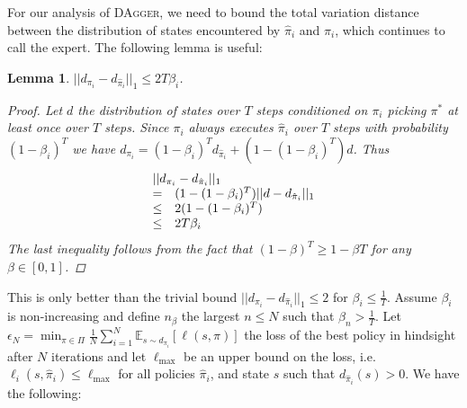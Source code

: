 \documentclass[twoside]{article}
\newtheorem{lem}{Lemma}[section]
\newcommand{\todo}[1]{\textcolor{red}{[To do: #1]}\index[todo]{#1}}
\begin{document}

For our analysis of \textsc{DAgger}, we need to bound the total variation distance between the distribution of states encountered by $\hat{\pi}_i$ and $\pi_i$,
which continues to call the expert. The following lemma is useful:
%
\begin{lem}
$||d_{\pi_i} - d_{\hat{\pi}_i}||_1 \leq 2 T \beta_i$.
\begin{proof}
Let $d$ the distribution of states over $T$ steps conditioned on $\pi_i$ picking $\pi^*$ at least once over $T$ steps. Since $\pi_i$ always executes $\hat{\pi}_i$ over $T$ steps with probability $(1-\beta_i)^T$ we have $d_{\pi_i} = (1-\beta_i)^T d_{\hat{\pi}_i} + (1-(1-\beta_i)^T) d$. Thus
\begin{displaymath}
\begin{array}{rl}
\multicolumn{2}{l}{||d_{\pi_i} - d_{\hat{\pi}_i}||_1}\\
= & (1-(1-\beta_i)^T) ||d - d_{\hat{\pi}_i}||_1\\
\leq & 2 (1-(1-\beta_i)^T)\\
\leq & 2 T \beta_i \\
\end{array}
\end{displaymath}
The last inequality follows from the fact that $(1-\beta)^T \geq 1 - \beta T$ for any $\beta \in [0,1]$.
\end{proof}
\end{lem}
This is only better than the trivial bound $||d_{\pi_i} - d_{\hat{\pi}_i}||_1 \leq 2$ for $\beta_i \leq \frac{1}{T}$. Assume $\beta_i$ is non-increasing and define $n_\beta$ the largest $n \leq N$ such that $\beta_n > \frac{1}{T}$. Let $\epsilon_N = \min_{\pi \in \Pi} \frac{1}{N} \sum_{i=1}^N \mathbb{E}_{s \sim d_{\pi_i}}[ \ell(s,\pi) ]$ the loss of the best policy in hindsight after $N$ iterations and let $\ell_{\max}$ be an upper bound on the loss, i.e. $\ell_i(s,\hat{\pi}_i) \leq \ell_{\max}$ for all policies $\hat{\pi}_i$, and state $s$ such that $d_{\hat{\pi}_i}(s) > 0$. We have the following:
\end{document}
